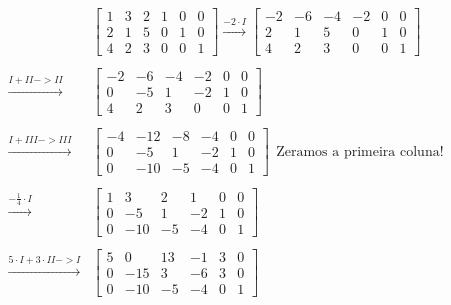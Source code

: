 \documentclass[
  portuguese,
  letterpaper,
  DIV=11,
  numbers=noendperiod]{scrreport}
\begin{document}
\[
\begin{aligned}
    &\left[\begin{array}{ccc|ccc}
        1 & 3 & 2 & 1 & 0 & 0 \\
        2 & 1 & 5 & 0 & 1 & 0 \\
        4 & 2 & 3 & 0 & 0 & 1
    \end{array}\right]  \stackrel{-2\cdot I}{\rightarrow}
    \left[\begin{array}{ccc|ccc}
        -2 & -6 & -4 & -2 & 0 & 0 \\
        2 & 1 & 5 & 0 & 1 & 0 \\
        4 & 2 & 3 & 0 & 0 & 1
    \end{array}\right] \\ \\
    \stackrel{I+II->II}{\rightarrow}
    &
    \left[\begin{array}{ccc|ccc}
        -2 & -6 & -4 & -2 & 0 & 0 \\
        0 & -5 & 1 & -2 & 1 & 0 \\
        4 & 2 & 3 & 0 & 0 & 1
    \end{array}\right] \\ \\
    \stackrel{I+III->III}{\rightarrow}
    &
    \left[\begin{array}{ccc|ccc}
        -4 & -12 & -8 & -4 & 0 & 0 \\
        0 & -5 & 1 & -2 & 1 & 0 \\
        0 & -10 & -5 & -4 & 0 & 1
    \end{array}\right] ~~\text{Zeramos a primeira coluna!} \\ \\
    \stackrel{-\frac{1}{4}\cdot I}{\rightarrow}
    &
    \left[\begin{array}{ccc|ccc}
        1 & 3 & 2 & 1 & 0 & 0 \\
        0 & -5 & 1 & -2 & 1 & 0 \\
        0 & -10 & -5 & -4 & 0 & 1
    \end{array}\right] \\ \\
    \stackrel{5\cdot I+3\cdot II -> I}{\rightarrow}
    &
    \left[\begin{array}{ccc|ccc}
        5 & 0 & 13 & -1 & 3 & 0 \\
        0 & -15 & 3 & -6 & 3 & 0 \\
        0 & -10 & -5 & -4 & 0 & 1
    \end{array}\right] \\ \\

\end{aligned}\]
\end{document}
